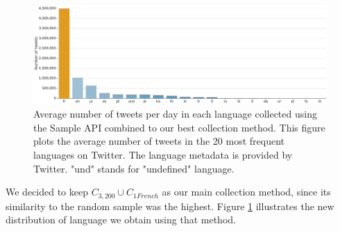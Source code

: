 \begin{figure}
\begin{center}
\includegraphics[width=1\textwidth]{figures/HistogramLanguagesFilter.pdf}
\end{center}

\caption[Average number of tweets per day in each language collected using the Sample API combined to our best collection method]{Average number of tweets per day in each language collected using the Sample API combined to our best collection method. This figure plots the average number of tweets in the 20 most frequent languages on Twitter. The language metadata is provided by Twitter. "und" stands for "undefined" language.}
\label{Figure:HistogramLanguagesFilter}
\end{figure}



We decided to keep $C_{3,200} \cup C_{1French}$ as our main collection method, since its similarity to the random sample was the highest. Figure \ref{Figure:HistogramLanguagesFilter} illustrates the new distribution of language we obtain using that method.

